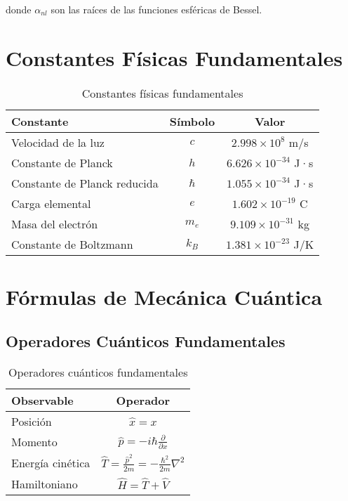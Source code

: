\documentclass[12pt,a4paper,twoside]{book}
\begin{document}
	donde $\alpha_{nl}$ son las raíces de las funciones esféricas de Bessel.
	
	\appendix
	\chapter{Constantes Físicas Fundamentales}
	
	\begin{table}[H]
		\centering
		\begin{tabular}{@{}lcc@{}}
			\toprule
			\textbf{Constante} & \textbf{Símbolo} & \textbf{Valor} \\
			\midrule
			Velocidad de la luz & $c$ & $2.998 \times 10^8$ m/s \\
			Constante de Planck & $h$ & $6.626 \times 10^{-34}$ J·s \\
			Constante de Planck reducida & $\hbar$ & $1.055 \times 10^{-34}$ J·s \\
			Carga elemental & $e$ & $1.602 \times 10^{-19}$ C \\
			Masa del electrón & $m_e$ & $9.109 \times 10^{-31}$ kg \\
			Constante de Boltzmann & $k_B$ & $1.381 \times 10^{-23}$ J/K \\
			\bottomrule
		\end{tabular}
		\caption{Constantes físicas fundamentales}
	\end{table}
	
	\chapter{Fórmulas de Mecánica Cuántica}
	
	\section{Operadores Cuánticos Fundamentales}
	
	\begin{table}[H]
		\centering
		\begin{tabular}{@{}lc@{}}
			\toprule
			\textbf{Observable} & \textbf{Operador} \\
			\midrule
			Posición & $\hat{x} = x$ \\
			Momento & $\hat{p} = -i\hbar \frac{\partial}{\partial x}$ \\
			Energía cinética & $\hat{T} = \frac{\hat{p}^2}{2m} = -\frac{\hbar^2}{2m}\nabla^2$ \\
			Hamiltoniano & $\hat{H} = \hat{T} + \hat{V}$ \\
			\bottomrule
		\end{tabular}
		\caption{Operadores cuánticos fundamentales}
	\end{table}
	
\end{document}
